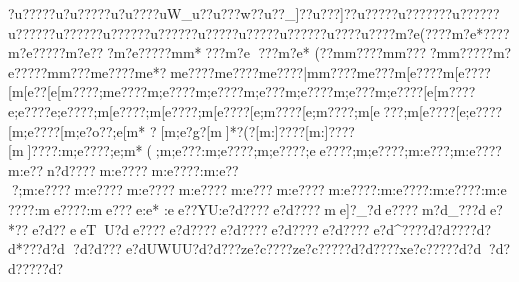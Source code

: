 {{{{{{{{{{{{{{{{{{{{{{{{{{{{{{{{{{{{{{{{{{{{{{{{{{{{{{{{{{{{{{{{{{{{{{{{{{{{{{{{{{{{{{{{{{{{{{{{{{{{{{{{{{{{{{{{{{{{{{{{{{{{{{{{{{{{{{{{{{{{{{{{{{{{{{{{{{{{{{{{{{{{{{{{{{{{{{{{{{{{{{{{{{{{{{{{{{{{{{{{{{{{{{{{{{{{{{{{{{{{{{{{{{{{{{{{{{{{{{{{{{{{{{{{{{{{{{{{{{{{{{{{{{{{{{{{{{{{{{{{{{{{{{{{{{{{{{{{{{{{{{{{{{{{{{{{{{{{{{{{{{{{{{{{{{{{{{{{{{{{{{{{{{{{{{{{{{{{{{{{{{{{{{{{{{{{{{{{{{{{{{{{{{{{{{{{{{{{{{{{{{{{{{{{{{{{{{{{{{{{{{{{{{{{{{{{{{{{{{{{{{{{{{{{{{{{{{{{{{{{{{{{{{{{{{{{{{{{{{{{{{{{{{{{{{{{{{{{{{{{{{{{{{{{{{{{{{{{{{{{{{{{{{{{{{{{{{{{{{{{{{{{{{{{{{{{{{{{{{{{{{{{{{{{{{{{{{{{{{{{{{{{{{{{{{{{{{{{{{{{{{{{{{{{{{{{{{{{{{{{{{{{{{{{{{{{{{{{{{{{{{{{{{{{{{{{{{{{{{{{{{{{{{{{{{{{{{{{{{{{{{{{{{{{{{{{{{{{{{{{{{{{{{{{{{{{{{{{{{{{{{{{{{{{{{{{{{{{{{{{{{{{{{{{{{{{{{{{{{{{{{{{{{{{{{{{{{{{{{{{{{{{{{{{{{{{{{{{{{{{{{{{{{{{{{{{{{{{{{{{{{{{{{{{{{{{{{{{{{{{{{{{{{{{{{{{{{{{{{{{{{{{{{{{{{{{{{{{{{{{{{{{{{{{{{{{{{{{{{{{{{{{{{{{{{{{{{{{{{{{{{{{{{{{{{{{{{{{{{{{{{{{{{{{{{{{{{{{{{{{{{{{{{{{{{{{{{{{{{{{{{{{{{{{{{{{{{{{{{{{{{{{{{{{{{{{{{{{{{{{{{{{{{{{{{{{{{{{{{{{{{{{{{{{{{{{{{{{{{{{{{{{{{{{{{{{{{{{{{{{{{{{{{{{{{{{{{{{{{{{{{{{{{{{{{{{{{{{{{{{{{{{{{{{{{{{{{{{{{{{{{{{{{{{{{{{{{{{{{{{{{{{{{{{{{{{{{{{{{{{{{{{{{{{{{{{{{{{{{{{{{{{{{{{{{{{{{{{{{{{{{{{{{{{{{{{{{{{{{{{{{{{{{{{{{{{{{{{{{{{{{{{{{{{{{{{{{{{{{{{{{{{{{{{{{{{{{{{{{{{{{{{{{{{{{{{{{{{{{{{{{{{{{{{{{{{{{{{{{{{{{{{{{{{{{{{{{{{{{{{{{{{{{{{{{{{{{{{{{{{{{{{{{{{{{{{{{{{{{{{{{{{{{{{{{{{{{{{{{{{{{{{{{{{{{{{{{{{{{{{{{{{{{{{{{{{{{{{{{{{{{{{{{{{{{{{{{{{{{{{{{{{{{{{{{{{{{{{{{{{{{{{{{{{{{{{{{{{{{{{{{{{{{{{{{{{{{{{{{{{{{{{{{{{{{{{{{{{{{{{{{{{{{{{{{{{{{{{{{{{{{{{{{{{{{{{{{{{{{{{{{{{{{{{{{{{{{{{{{{{{{{{{{{{{{{{{{{{{{{{{{{{{{{{{{{{{{{{{{{{{{{{{{{{{{{{{{{{{{{{{{{{{{{{{{{{{{{{{{{{{{{{{{{{{{{{{{{{{{{{{{{{{{{{{{{{{{{{{{{{{{{{{{{{{{{{{{{{{{{{{{{{{{{{{{{{{{{{{{{{{{{{{{{{{{{{{{{{{{{{{{{{{{{{{{{{{{{{{{{{{{{{{{{{{{{{{{{{{{{{{{{{{{{{{{{{{{{{{{{{{{{{{{{{{{{{{{{{{{{{{{{{{{{{{{{{{{{{{{{{{{{{{{{{{{{{{{{{{{{{{{{{{{{{{{{{{{{{{{{{{{{{{{{{{{{{{{{{{{{{{{{{{{{{{{{{{{{{{{{{{{{{{{{{{{{{{{{{{{{{{{{{{{{{{{{{{{{{{{{{{{{{{{{{{{{{{{{{{{{{{{{{{{{{{{{{{{{{{{{{{{{{{{{{{{{{{{{{{{{{{{{{{{{{{{{{{{{{{{{{{{{{{{{{{{{{{{{{{{{{{{{{{{{{{{{{{{{{{{{{{{{{{{{{{{{{{{{{{{{{{{{{{{{{{{{{{{{{{{{{{{{{{{{{{{{{{{{{{{{{{{{{{{{{{{{{{{{{{{{{{{{{{{{{{{{{{{{{{{{{{{{{{{{{{{{{{{{{{{{{{{{{{{{{{{{{{{{{{{{{{{{{{{{{{{{{{{{{{{{{{{{{{{{{{{{{{{{{{{{{{{{{{{{{{{{{{{{{{{{{{{{{{{{{{{{{{{{{{{{{{{{{{{{{{{{{{?u?????u?u?????u?u???}?uW_u?}?u???w?}?u??_]?}?u???]?}?u?????u?}?????}?u?????}?u?????}?u?????}?u?????}?u?????}?u????}?u????}?u?????}?u???}?u????m?e(????m?e*????m?e?????m?e?? ?m?e?????m{m*???m?e ???m?e* (??m{m?? ??m{m????m{m?????m?e?????m{m???{m{e????{m{e*? {m{e????{m{e????{m{e????|m{m????{m{e???{m[e????{m[e????[m[e??[e[m????;m{e????{m;e????{m;e????{m;e???{m;e????{m;e???{m;e????[e[m????{e;e????{e;e????;m[e????;m[e????;m[e????[e;m????[e;m????;m[e???;m[e????[e;e????[m;e????[m;e?o??;e[m* ?[m;e?g}?[m]*?(?[m:]????[m:]????[m]????:m;e????;e;m*(;m;e???:m;e????;m;e????;ee????;m;e????;m:e???;m:e????m:e??n?d????m:e????m:e????:m:e???;m:e????m:e????m:e????m:e????m:e}???m:e????m:e????:m:e????:m:e????:m:e????:me????:me???e:e*   :ee??YU:e?d????e?d????me]?}_?de????m?d_}???de?*??e?d??eeTU?de????e?d????e?d????e?d????e?d????e?d^????d?d??? ?d?d *???d?d  
?d?d???e?dUWUU?d?d??? ze?c????ze?c?????d?d????xe?c?????d?d  ?d?d?????d?}}}}}}}}}}}}}}}}}}}}}}}}}}}}}}}}}}}}}}}}}}}}}}}}}}}}}}}}}}}}}}}}}}}}}}}}}}}}}}}}}}}}}}}}}}}}}}}}}}}}}}}}}}}}}}}}}}}}}}}}}}}}}}}}}}}}}}}}}}}}}}}}}}}}}}}}}}}}}}}}}}}}}}}}}}}}}}}}}}}}}}}}}}}}}}}}}}}}}}}}}}}}}}}}}}}}}}}}}}}}}}}}}}}}}}}}}}}}}}}}}}}}}}}}}}}}}}}}}}}}}}}}}}}}}}}}}}}}}}}}}}}}}}}}}}}}}}}}}}}}}}}}}}}}}}}}}}}}}}}}}}}}}}}}}}}}}}}}}}}}}}}}}}}}}}}}}}}}}}}}}}}}}}}}}}}}}}}}}}}}}}}}}}}}}}}}}}}}}}}}}}}}}}}}}}}}}}}}}}}}}}}}}}}}}}}}}}}}}}}}}}}}}}}}}}}}}}}}}}}}}}}}}}}}}}}}}}}}}}}}}}}}}}}}}}}}}}}}}}}}}}}}}}}}}}}}}}}}}}}}}}}}}}}}}}}}}}}}}}}}}}}}}}}}}}}}}}}}}}}}}}}}}}}}}}}}}}}}}}}}}}}}}}}}}}}}}}}}}}}}}}}}}}}}}}}}}}}}}}}}}}}}}}}}}}}}}}}}}}}}}}}}}}}}}}}}}}}}}}}}}}}}}}}}}}}}}}}}}}}}}}}}}}}}}}}}}}}}}}}}}}}}}}}}}}}}}}}}}}}}}}}}}}}}}}}}}}}}}}}}}}}}}}}}}}}}}}}}}}}}}}}}}}}}}}}}}}}}}}}}}}}}}}}}}}}}}}}}}}}}}}}}}}}}}}}}}}}}}}}}}}}}}}}}}}}}}}}}}}}}}}}}}}}}}}}}}}}}}}}}}}}}}}}}}}}}}}}}}}}}}}}}}}}}}}}}}}}}}}}}}}}}}}}}}}}}}}}}}}}}}}}}}}}}}}}}}}}}}}}}}}}}}}}}}}}}}}}}}}}}}}}}}}}}}}}}}}}}}}}}}}}}}}}}}}}}}}}}}}}}}}}}}}}}}}}}}}}}}}}}}}}}}}}}}}}}}}}}}}}}}}}}}}}}}}}}}}}}}}}}}}}}}}}}}}}}}}}}}}}}}}}}}}}}}}}}}}}}}}}}}}}}}}}}}}}}}}}}}}}}}}}}}}}}}}}}}}}}}}}}}}}}}}}}}}}}}}}}}}}}}}}}}}}}}}}}}}}}}}}}}}}}}}}}}}}}}}}}}}}}}}}}}}}}}}}}}}}}}}}}}}}}}}}}}}}}}}}}}}}}}}}}}}}}}}}}}}}}}}}}}}}}}}}}}}}}}}}}}}}}}}}}}}}}}}}}}}}}}}}}}}}}}}}}}}}}}}}}}}}}}}}}}}}}}}}}}}}}}}}}}}}}}}}}}}}}}}}}}}}}}}}}}}}}}}}}}}}}}}}}}}}}}}}}}}}}}}}}}}}}}}}}}}}}}}}}}}}}}}}}}}}}}}}}}}}}}}}}}}}}}}}}}}}}}}}}}}}}}}}}}}}}}}}}}}}}}}}}}}}}}}}}}}}}}}}}}}}}}}}}}}}}}}}}}}}}}}}}}}}}}}}}}}}}}}}}}}}}}}}}}}}}}}}}}}}}}}}}}}}}}}}}}}}}}}}}}}}}}}}}}}}}}}}}}}}}}}}}}}}}}}}}}}}}}}}}}}}}}}}}}}}}}}}}}}}}}}}}}}}}}}}}}}}}}}}}}}}}}}}}}}}}}}}}}}}}}}}}}}}}}}}}}}}}}}}}}}}}}}}}}}}}}}}}}}}}}}}}}}}}}}}}}}}}}}}}}}}}}}}}}}}}}}}}}}}}}}}}}}}}}}}}}}}}}}}}}}}}}}}}}}}}}}}}}}}}}}}}}}}}}}}}}}}}}}}}}}}}}}}}}}}}}}}}}}}}}}}}}}}}}}}}}}}}}}}}}}}}}}}}}}}}}}}}}}}}}}}}}}}}}}}}}}}}}}}}}}}}}}}}}}}}}}}}}}}}}}}}}}}}}}}}}}}}}}}}}}}}}}}}}}}}}}}}}}}}}}}}}}}}}}}}}}}}}}}}}}}}}}}}}}}}}}}}}}}}}}}}}}}}}}}}}}}}}}}}}}}}}}}}}}}}}}}}}}}}}}}}}}}}}}}}}}}}}}}}}}}}}}}}}}}}}}}}}}}}}}}}}}}}}}}}}}}}}}}}}}}}}}}}}}}}}}}}}}}}}}}}}}}}}}}}}}}}}}}}}}}}}}}}}}}}}}}}}}}}}}}}}}}}}}}}}}}}}}}}}}}}}}}}}}}}}}}}}}}}}}}}}}}}}}}}}}}}}}}}}}}}}}}}}}}}}}}}}}}}}}}}}}}}}}}}}}}}}}}}}}}}}}}}}}}}}}}}}}}}}}}}}}}}}}}}}}}}}}}}}}}}}}}}}}}}}}}}}}}}}}}}}}}}}}}}}}}}}}}}}}}}}}}}}}}}}}}}}}}}}}}}}}}}}}}}}}}}}}}}}}}}}}}}}}
